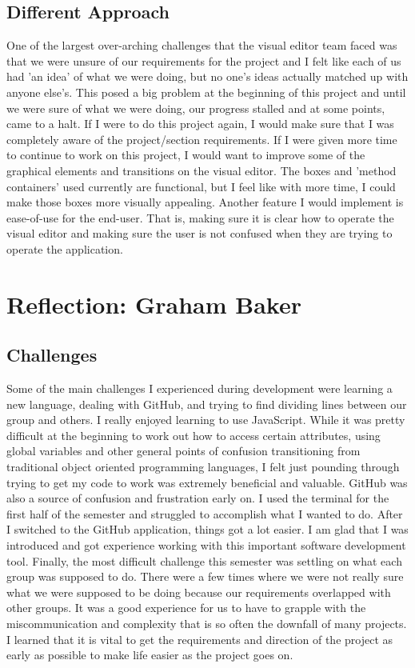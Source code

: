 \documentclass[a4paper]{article}
\begin{document}
\subsection{Different Approach}
One of the largest over-arching challenges that the visual editor team faced was that we were unsure of our requirements for the project and I felt like each of us had 'an idea' of what we were doing, but no one's ideas actually matched up with anyone else's. This posed a big problem at the beginning of this project and until we were sure of what we were doing, our progress stalled and at some points, came to a halt. If I were to do this project again, I would make sure that I was completely aware of the project/section requirements. If I were given more time to continue to work on this project, I would want to improve some of the graphical elements and transitions on the visual editor. The boxes and 'method containers' used currently are functional, but I feel like with more time, I could make those boxes more visually appealing. Another feature I would implement is ease-of-use for the end-user. That is, making sure it is clear how to operate the visual editor and making sure the user is not confused when they are trying to operate the application.
\section{Reflection: Graham Baker}
\subsection{Challenges}
Some of the main challenges I experienced during development were learning a new language, dealing with GitHub, and trying to find dividing lines between our group and others. I really enjoyed learning to use JavaScript. While it was pretty difficult at the beginning to work out how to access certain attributes, using global variables and other general points of confusion transitioning from traditional object oriented programming languages, I felt just pounding through trying to get my code to work was extremely beneficial and valuable. GitHub was also a source of confusion and frustration early on. I used the terminal for the first half of the semester and struggled to accomplish what I wanted to do. After I switched to the GitHub application, things got a lot easier. I am glad that I was introduced and got experience working with this important software development tool. Finally, the most difficult challenge this semester was settling on what each group was supposed to do. There were a few times where we were not really sure what we were supposed to be doing because our requirements overlapped with other groups. It was a good experience for us to have to grapple with the miscommunication and complexity that is so often the downfall of many projects. I learned that it is vital to get the requirements and direction of the project as early as possible to make life easier as the project goes on. 
\end{document}
